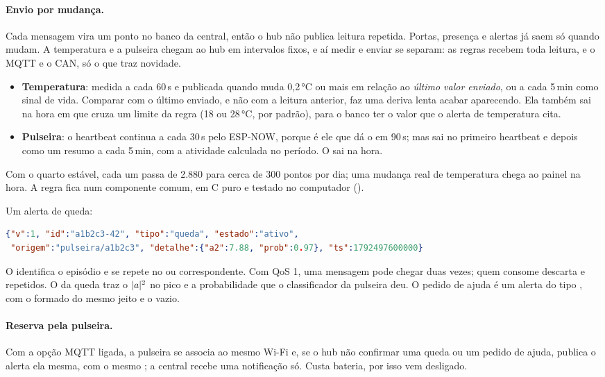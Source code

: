 \paragraph{Envio por mudança.} Cada mensagem vira um ponto no banco da central, então o hub
não publica leitura repetida. Portas, presença e alertas já saem só quando mudam. A temperatura
e a pulseira chegam ao hub em intervalos fixos, e aí medir e enviar se separam: as regras
recebem toda leitura, e o MQTT e o CAN, só o que traz novidade.
\begin{itemize}
  \item \textbf{Temperatura}: medida a cada 60\,s e publicada quando muda 0,2\,°C ou mais em
        relação ao \emph{último valor enviado}, ou a cada 5\,min como sinal de vida. Comparar com o
        último enviado, e não com a leitura anterior, faz uma deriva lenta acabar aparecendo. Ela
        também sai na hora em que cruza um limite da regra (18 ou 28\,°C, por padrão), para o
        banco ter o valor que o alerta de temperatura cita.
  \item \textbf{Pulseira}: o heartbeat continua a cada 30\,s pelo ESP-NOW, porque é ele que dá o
         em 90\,s; mas  sai no primeiro heartbeat e depois como
        um resumo a cada 5\,min, com a atividade calculada no período. O  sai na hora.
\end{itemize}
Com o quarto estável, cada um passa de 2.880 para cerca de 300 pontos por dia; uma mudança
real de temperatura chega ao painel na hora. A regra fica num componente comum, em C puro e
testado no computador ().

\noindent Um alerta de queda:
\begin{lstlisting}[language=json]
{"v":1, "id":"a1b2c3-42", "tipo":"queda", "estado":"ativo",
 "origem":"pulseira/a1b2c3", "detalhe":{"a2":7.88, "prob":0.97}, "ts":1792497600000}
\end{lstlisting}

O  identifica o episódio e se repete no  ou 
correspondente. Com QoS 1, uma mensagem pode chegar duas vezes; quem consome descarta
 e  repetidos. O  da queda traz o $|a|^2$ no pico e a
probabilidade que o classificador da pulseira deu. O pedido de ajuda é um alerta do tipo
, com o  formado do mesmo jeito e o  vazio.

\paragraph{Reserva pela pulseira.} Com a opção MQTT ligada, a pulseira se associa ao mesmo
Wi-Fi e, se o hub não confirmar uma queda ou um pedido de ajuda, publica o alerta ela mesma,
com o mesmo ;
a central recebe uma notificação só. Custa bateria, por isso vem desligado.

